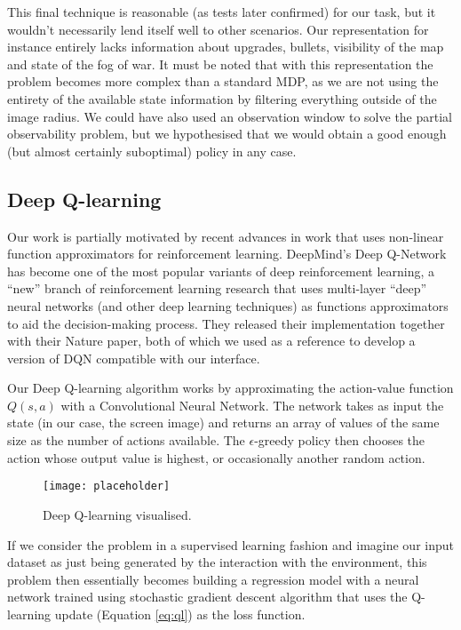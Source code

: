 This final technique is reasonable (as tests later confirmed) for our task, but
it wouldn't necessarily lend itself well to other scenarios. Our representation
for instance entirely lacks information about upgrades, bullets, visibility of
the map and state of the fog of war. It must be noted that with this
representation the problem becomes more complex than a standard MDP, as we are
not using the entirety of the available state information by filtering
everything outside of the image radius. We could have also used an observation
window to solve the partial observability problem, but we hypothesised that we
would obtain a good enough (but almost certainly suboptimal) policy in any case.


\subsection{Deep Q-learning}

Our work is partially motivated by recent advances in work that uses non-linear
function approximators for reinforcement learning. DeepMind's Deep Q-Network has
become one of the most popular variants of deep reinforcement learning, a
``new'' branch of reinforcement learning research that uses multi-layer ``deep''
neural networks (and other deep learning techniques) as functions approximators
to aid the decision-making process. They released their implementation together
with their Nature paper, both of which we used as a reference to develop a
version of DQN compatible with our interface.

Our Deep Q-learning algorithm works by approximating the action-value function
$Q(s, a)$ with a Convolutional Neural Network. The network takes as input the
state (in our case, the screen image) and returns an array of values of the same
size as the number of actions available. The $\epsilon$-greedy policy then
chooses the action whose output value is highest, or occasionally another random
action.

\begin{figure}[h]
    \centering
    \texttt{[image: placeholder]}
    \caption{Deep Q-learning visualised.}
    \label{fig:dqn}
\end{figure}

If we consider the problem in a supervised learning fashion and imagine our
input dataset as just being generated by the interaction with the environment,
this problem then essentially becomes building a regression model with a neural
network trained using stochastic gradient descent algorithm that uses the
Q-learning update (Equation \ref{eq:ql}) as the loss function.

